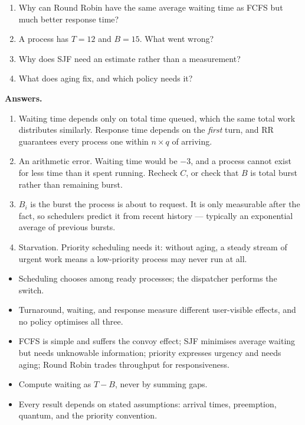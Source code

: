 



\begin{quickcheck}
\begin{enumerate}
  \item Why can Round Robin have the same average waiting time as FCFS but much better response time?
  \item A process has $T = 12$ and $B = 15$. What went wrong?
  \item Why does SJF need an estimate rather than a measurement?
  \item What does aging fix, and which policy needs it?
\end{enumerate}

\medskip\noindent\textbf{Answers.}
\begin{enumerate}
  \item Waiting time depends only on total time queued, which the same total work distributes similarly. Response time depends on the \emph{first} turn, and RR guarantees every process one within $n \times q$ of arriving.
  \item An arithmetic error. Waiting time would be $-3$, and a process cannot exist for less time than it spent running. Recheck $C$, or check that $B$ is total burst rather than remaining burst.
  \item $B_i$ is the burst the process is about to request. It is only measurable after the fact, so schedulers predict it from recent history --- typically an exponential average of previous bursts.
  \item Starvation. Priority scheduling needs it: without aging, a steady stream of urgent work means a low-priority process may never run at all.
\end{enumerate}
\end{quickcheck}

\begin{chapterrecap}
\begin{itemize}
  \item Scheduling chooses among ready processes; the dispatcher performs the switch.
  \item Turnaround, waiting, and response measure different user-visible effects, and no policy optimises all three.
  \item FCFS is simple and suffers the convoy effect; SJF minimises average waiting but needs unknowable information; priority expresses urgency and needs aging; Round Robin trades throughput for responsiveness.
  \item Compute waiting as $T - B$, never by summing gaps.
  \item Every result depends on stated assumptions: arrival times, preemption, quantum, and the priority convention.
\end{itemize}
\end{chapterrecap}
